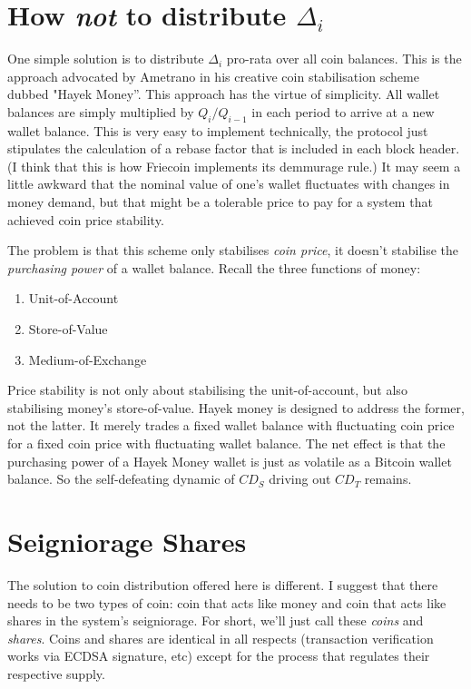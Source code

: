 \documentclass[twocolumn]{article}
\begin{document}
\section*{How \emph{not} to distribute $\Delta_{i}$}
One simple solution is to distribute $\Delta_{i}$ pro-rata over all
coin balances. This is the approach advocated by Ametrano in his
creative coin stabilisation scheme dubbed "Hayek
Money''\cite{ametrano}. This approach has the virtue of
simplicity. All wallet balances are simply multiplied by $Q_{i} /
Q_{i-1}$ in each period to arrive at a new wallet balance. This is
very easy to implement technically, the protocol just stipulates the
calculation of a rebase factor that is included in each block
header. (I think that this is how Friecoin implements its demmurage
rule.) It may seem a little awkward that the nominal value of one's
wallet fluctuates with changes in money demand, but that might be a
tolerable price to pay for a system that achieved coin price stability.

The problem is that this scheme only stabilises \emph{coin price}, it
doesn't stabilise the \emph{purchasing power} of a wallet
balance. Recall the three functions of money:
\begin{enumerate}
\item Unit-of-Account
\item Store-of-Value
\item Medium-of-Exchange
\end{enumerate}
Price stability is not only about stabilising the unit-of-account, but
also stabilising money's store-of-value. Hayek money is designed to
address the former, not the latter. It merely trades a fixed wallet
balance with fluctuating coin price for a fixed coin price with
fluctuating wallet balance. The net effect is that the purchasing
power of a Hayek Money wallet is just as volatile as a Bitcoin wallet
balance. So the self-defeating dynamic of $CD_{S}$ driving out
$CD_{T}$ remains.

\section*{Seigniorage Shares}
The solution to coin distribution offered here is different. I suggest
that there needs to be two types of coin: coin that acts like money
and coin that acts like shares in the system's seigniorage. For short,
we'll just call these \emph{coins} and \emph{shares}. Coins and shares
are identical in all respects (transaction verification works via
ECDSA signature, etc) except for the process that regulates their
respective supply.
\end{document}

